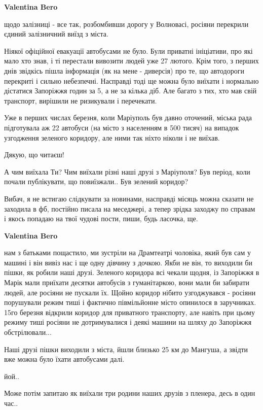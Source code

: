\begin{itemize} %
\textbf{Valentina Bero} 

щодо залізниці - все так, розбомбивши дорогу у Волновасі, росіяни перекрили
єдиний залізничний виїзд з міста.

Ніякої офіційної евакуації автобусами не було. Були приватні ініціативи, про
які мало хто знав, і ті перестали вивозити людей уже 27 лютого. Крім того, з
перших днів звідкісь пішла інформація (як на мене - диверсія) про те, що
автодороги перекриті і сильно небезпечні. Насправді тоді ще можна було виїхати
і нормально дістатися Запоріжжя годин за 5, а не за кілька діб. Але багато з
тих, хто мав свій транспорт, вирішили не ризикували і перечекати.

Уже в перших числах березня, коли Маріуполь був давно оточений, міська рада
підготувала аж 22 автобуси (на місто з населенням в 500 тисяч) на випадок
узгодження зеленого коридору, але ними так ніхто ніколи і не виїхав.

Дякую, що читаєш!🙏


А чим виїхала Ти? Чим виїхали різні наші друзі з Маріуполя? Був період, коли
почали публікувати, що повиїзжали.. Був зелений коридор?

Вибач, я не встигаю слідкувати за новинами, насправді місяць можна сказати не
заходила в фб, постійно писала на меседжері, а тепер зрідка заходжу по справам
і якось попадаю на твої чудові пости, пиши, будь ласочка, ще.

\textbf{Valentina Bero} 

нам з батьками пощастило, ми зустріли на Драмтеатрі чоловіка, який був сам у
машині і він вивіз нас і ще одну дівчину з дочкою. Якби не він, то виходили би
пішки, як робили наші друзі. Зеленого коридора всі чекали щодня, із Запоріжжя в
Марік мали приїхати десятки автобусів з гуманітаркою, вони мали би забирати
людей, але росіяни не пускали їх. Щойно коридор нібито узгоджувався - росіяни
порушували режим тиші і фактично півмільйонне місто опинилося в заручниках.
15го березня відкрили коридор для приватного транспорту, але навіть при цьому
режиму тиші росіяни не дотримувалися і деякі машини на шляху до Запоріжжя
обстрілювали...


Наші друзі пішки виходили з міста, йшли близько 25 км до Мангуша, а звідти вже
можна було їхати автобусами далі.


йой..

Може потім запитаю як виїхали три родини наших друзів з пленера, десь в один
час..

\end{itemize} %

